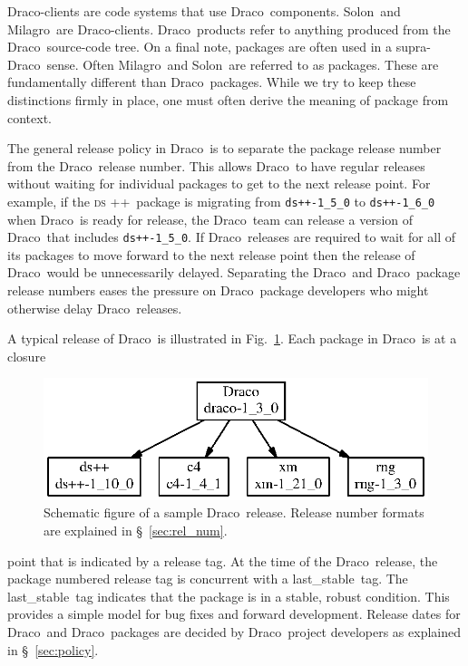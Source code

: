 \documentclass[11pt]{nmemo}
\newcommand{\draco}{{\normalfont\normalsize\sffamily Draco}}
\newcommand{\milagro}{{\normalfont\normalsize\sffamily Milagro}}
\newcommand{\solon}{{\normalfont\normalsize\sffamily Solon}}
\newcommand{\dsxx}{{\normalfont\normalsize\scshape ds\raisebox{.2ex}
  {\scriptsize ++}}}
\newcommand{\stable}{{\normalfont\normalsize\ttfamily last\_stable}}
\begin{document}
\draco-clients are code systems that use \draco\ components.  \solon\ 
and \milagro\ are \draco-clients.  \draco\ products refer to anything
produced from the \draco\ source-code tree.  On a final note, packages
are often used in a supra-\draco\ sense.  Often \milagro\ and \solon\ 
are referred to as packages.  These are fundamentally different than
\draco\ packages.  While we try to keep these distinctions firmly in
place, one must often derive the meaning of package from context.

The general release policy in \draco\ is to separate the package
release number from the \draco\ release number.  This allows \draco\ 
to have regular releases without waiting for individual packages to
get to the next release point.  For example, if the \dsxx\ package is
migrating from \texttt{ds++-1\_5\_0} to \texttt{ds++-1\_6\_0} when
\draco\ is ready for release, the \draco\ team can release a version
of \draco\ that includes \texttt{ds++-1\_5\_0}.  If \draco\ releases
are required to wait for all of its packages to move forward to the
next release point then the release of \draco\ would be unnecessarily
delayed.  Separating the \draco\ and \draco\ package release numbers
eases the pressure on \draco\ package developers who might otherwise
delay \draco\ releases.

A typical release of \draco\ is illustrated in
Fig.~\ref{fig:drelease}.  Each package in \draco\ is at a closure
\begin{figure}
  \centerline{\includegraphics{drelease.eps}}
  \caption{Schematic figure of a sample \draco\ release.  Release
    number formats are explained in \S~\ref{sec:rel_num}.}
  \label{fig:drelease}
\end{figure}
point that is indicated by a release tag. At the time of the \draco\ 
release, the package numbered release tag is concurrent with a
\stable\ tag.  The \stable\ tag indicates that the package is in a
stable, robust condition.  This provides a simple model for bug fixes
and forward development.  Release dates for \draco\ and \draco\ 
packages are decided by \draco\ project developers as explained in
\S~\ref{sec:policy}.
\end{document}
